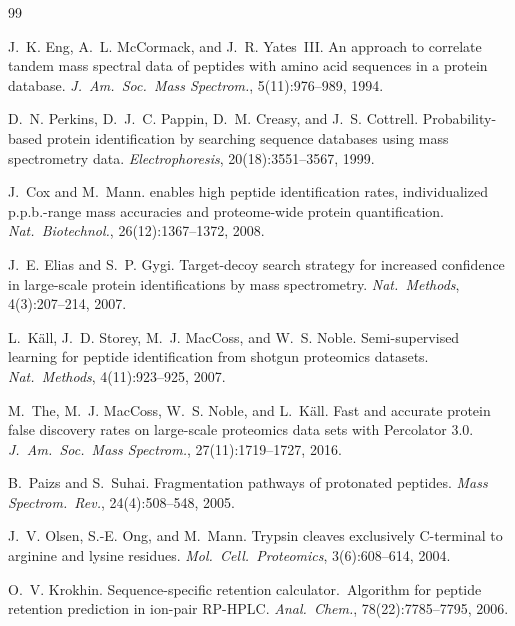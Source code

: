 \documentclass[11pt,a4paper]{article}
\theoremstyle{definition}
\theoremstyle{remark}
\begin{document}
\begingroup
\small
\begin{thebibliography}{99}

J.~K. Eng, A.~L. McCormack, and J.~R. Yates~III.
\newblock An approach to correlate tandem mass spectral data of peptides
  with amino acid sequences in a protein database.
\newblock \emph{J.\ Am.\ Soc.\ Mass Spectrom.}, 5(11):976--989, 1994.

D.~N. Perkins, D.~J.~C. Pappin, D.~M. Creasy, and J.~S. Cottrell.
\newblock Probability-based protein identification by searching sequence
  databases using mass spectrometry data.
\newblock \emph{Electrophoresis}, 20(18):3551--3567, 1999.

J.~Cox and M.~Mann.
 enables high peptide identification rates,
  individualized p.p.b.-range mass accuracies and proteome-wide protein
  quantification.
\newblock \emph{Nat.\ Biotechnol.}, 26(12):1367--1372, 2008.

J.~E. Elias and S.~P. Gygi.
\newblock Target-decoy search strategy for increased confidence in
  large-scale protein identifications by mass spectrometry.
\newblock \emph{Nat.\ Methods}, 4(3):207--214, 2007.

L.~K\"all, J.~D. Storey, M.~J. MacCoss, and W.~S. Noble.
\newblock Semi-supervised learning for peptide identification from
  shotgun proteomics datasets.
\newblock \emph{Nat.\ Methods}, 4(11):923--925, 2007.

M.~The, M.~J. MacCoss, W.~S. Noble, and L.~K\"all.
\newblock Fast and accurate protein false discovery rates on large-scale
  proteomics data sets with {Percolator 3.0}.
\newblock \emph{J.\ Am.\ Soc.\ Mass Spectrom.}, 27(11):1719--1727, 2016.

B.~Paizs and S.~Suhai.
\newblock Fragmentation pathways of protonated peptides.
\newblock \emph{Mass Spectrom.\ Rev.}, 24(4):508--548, 2005.

J.~V. Olsen, S.-E. Ong, and M.~Mann.
\newblock Trypsin cleaves exclusively {C}-terminal to arginine and
  lysine residues.
\newblock \emph{Mol.\ Cell.\ Proteomics}, 3(6):608--614, 2004.

O.~V. Krokhin.
\newblock Sequence-specific retention calculator.\ {Algorithm} for
  peptide retention prediction in ion-pair {RP-HPLC}.
\newblock \emph{Anal.\ Chem.}, 78(22):7785--7795, 2006.


\end{thebibliography}
\end{document}

